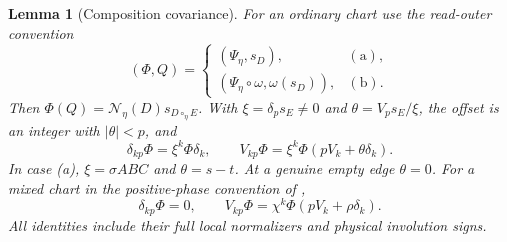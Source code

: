 \documentclass[11pt,a4paper]{amsart}
\numberwithin{equation}{section}
\theoremstyle{plain}
\newtheorem{lemma}[theorem]{Lemma}
\theoremstyle{definition}
\begin{document}
\begin{lemma}[Composition covariance]\label{lem:covariance}
For an ordinary chart use the read-outer convention
\[
 (\Phi,Q)=
 \begin{cases}
  (\Psi_\eta,s_D),&\mathrm{(a)},\\
  (\Psi_\eta\circ\omega,\omega(s_D)),&\mathrm{(b)}.
 \end{cases}
\]
Then \(\Phi(Q)=\mathcal N_\eta(D)s_{D\circ_\eta E}\).  With
\(\xi=\delta_p s_E\ne0\) and \(\theta=V_p s_E/\xi\), the offset is an integer with \(|\theta|<p\), and
\begin{equation}\label{eq:ordinary-covariance}
 \delta_{kp}\Phi=\xi^k\Phi\delta_k,\qquad
 V_{kp}\Phi=\xi^k\Phi(pV_k+\theta\delta_k).
\end{equation}
In case (a), \(\xi=\sigma ABC\) and \(\theta=s-t\).  At a genuine empty edge \(\theta=0\).  For a mixed chart in the positive-phase convention of ,
\begin{equation}\label{eq:mixed-covariance}
 \delta_{kp}\Phi=0,\qquad
 V_{kp}\Phi=\chi^k\Phi(pV_k+\rho\delta_k).
\end{equation}
All identities include their full local normalizers and physical involution signs.
\end{lemma}
\end{document}
